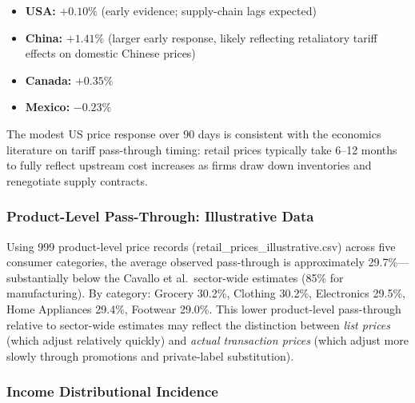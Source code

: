 \documentclass[12pt]{article}
\begin{document}
\begin{itemize}
    \item \textbf{USA:} $+0.10\%$ (early evidence; supply-chain lags expected)
    \item \textbf{China:} $+1.41\%$ (larger early response, likely reflecting
    retaliatory tariff effects on domestic Chinese prices)
    \item \textbf{Canada:} $+0.35\%$
    \item \textbf{Mexico:} $-0.23\%$
\end{itemize}

The modest US price response over 90 days is consistent with the economics
literature on tariff pass-through timing: retail prices typically take 6--12
months to fully reflect upstream cost increases as firms draw down inventories
and renegotiate supply contracts.

\subsubsection{Product-Level Pass-Through: Illustrative Data}

Using 999 product-level price records (retail\_prices\_illustrative.csv) across
five consumer categories, the average observed pass-through is approximately
29.7\%---substantially below the Cavallo et al.\ sector-wide estimates (85\% for
manufacturing). By category: Grocery 30.2\%, Clothing 30.2\%, Electronics
29.5\%, Home Appliances 29.4\%, Footwear 29.0\%. This lower product-level
pass-through relative to sector-wide estimates may reflect the distinction
between \emph{list prices} (which adjust relatively quickly) and \emph{actual
transaction prices} (which adjust more slowly through promotions and
private-label substitution).

\subsubsection{Income Distributional Incidence}
\end{document}
